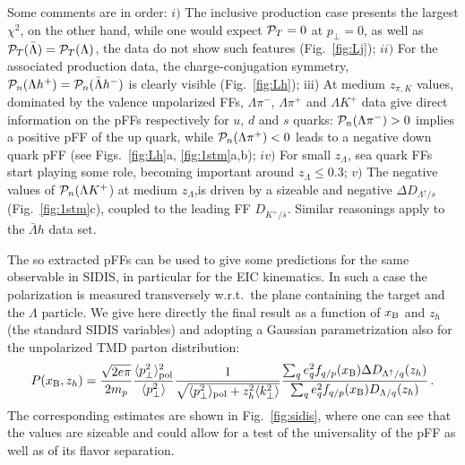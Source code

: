 \documentclass[submission, Proceedings]{SciPost}
\newcommand{\be}{\begin{equation}}
\newcommand{\ee}{\end{equation}}
\begin{document}
Some comments are in order:
$i)$ The inclusive production case presents the largest $\chi^2$, on the other hand, while one would expect ${\cal P}_T=0$ at $p_\perp=0$, as well as ${\cal P}_T(\bar\Lambda)={\cal P}_T(\Lambda)$, the data do not show such features (Fig.~\ref{fig:Lj});
$ii)$ For the associated production data, the charge-conjugation symmetry, ${\cal P}_n(\Lambda h^+)= {\cal P}_n(\bar\Lambda h^-)$ is clearly visible (Fig.~\ref{fig:Lh});
%
iii) At medium $z_{\pi ,K}$ values, dominated by the valence unpolarized FFs, $\Lambda \pi^-$, $\Lambda \pi^+$ and $\Lambda K^+$ data give direct information on the pFFs respectively for $u$, $d$ and $s$ quarks: ${\cal P}_n(\Lambda \pi^-)>0$ implies a positive pFF of the up quark, while ${\cal P}_n(\Lambda \pi^+)<0$ leads to a negative down quark pFF  (see Figs.~\ref{fig:Lh}a, \ref{fig:1stm}a,b);
$iv)$ For small $z_\Lambda$, sea quark FFs start playing some role, becoming important around $z_\Lambda \le 0.3$;
%
$v)$ The negative values of ${\cal P}_n(\Lambda K^+$) at medium $z_\Lambda$,is driven by a sizeable and negative $\Delta D_{\Lambda^\uparrow\!/s}$ (Fig.~\ref{fig:1stm}c), coupled to the leading FF $D_{K^+/\!\bar s}$. 
Similar reasonings apply to the $\bar\Lambda h$ data set.

The so extracted pFFs can be used to give some predictions for the same observable in SIDIS, in particular for the EIC kinematics. In such a case the polarization is measured transversely w.r.t.~the plane containing the target and the $\Lambda$ particle. We give here directly the final result as a function of $x_{\rm B}$ and $z_h$ (the standard SIDIS variables) and adopting a Gaussian parametrization also for the unpolarized TMD parton distribution:
\be
P(x_{\rm B},z_h) = \frac{\sqrt{2e\pi}}{2m_p}
\frac{\langle p_\perp^2\rangle^2_{\rm pol}}{\langle p_\perp^2\rangle}
\frac{1}{\sqrt {\langle p_\perp^2\rangle_{\rm pol} + z_h^2 \langle k_\perp^2\rangle }} \frac{\sum_q e_q^2 f_{q/p}(x_{\rm B})\Delta D_{\Lambda^\uparrow/q}(z_h)}{\sum_q e_q^2 f_{q/p}(x_{\rm B}) D_{\Lambda/q}(z_h)}\,.
\ee
The corresponding estimates are shown in Fig.~\ref{fig:sidis}, where one can see that the values are sizeable and could allow for a test of the universality of the pFF as well as of its flavor separation.
\end{document}
